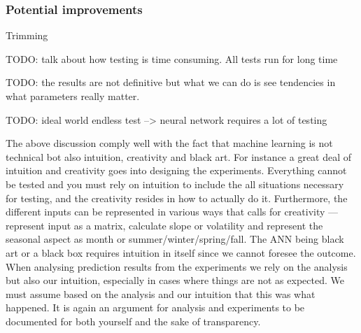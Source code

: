 \subsubsection{Potential improvements}



Trimming


TODO: talk about how testing is time consuming. All tests run for long time

TODO: the results are not definitive but what we can do is see tendencies in what parameters really matter.

TODO: ideal world endless test --> neural network requires a lot of testing

The above discussion comply well with the fact that machine learning is not technical bot also intuition, creativity and black art\cite{18}. For instance a great deal of intuition and creativity goes into designing the experiments. Everything cannot be tested and you must rely on intuition to include the all situations necessary for testing, and the creativity resides in how to actually do it. Furthermore, the different inputs can be represented in various ways that calls for creativity --- represent input as a matrix, calculate slope or volatility and represent the seasonal aspect as month or summer/winter/spring/fall. The ANN being black art or a black box requires intuition in itself since we cannot foresee the outcome. When analysing prediction results from the experiments we rely on the analysis but also our intuition, especially in cases where things are not as expected. We must assume based on the analysis and our intuition that this was what happened. It is again an argument for analysis and experiments to be documented for both yourself and the sake of transparency.








